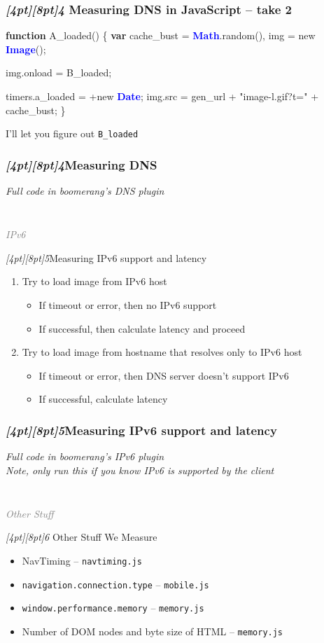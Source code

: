 \documentclass{beamer}
\newcommand{\sn}[1]{\textrm{\textit{\Huge{\raisebox{-3pt}[4pt][8pt]{\textcolor{f2elblue}{#1}}}}}\hspace{4pt}}
\newcommand{\innersplash}[1]{
  \begin{center}
    \large \textrm{\textit{ #1 } }
  \end{center}
}
\newcommand{\splashslide}[2][{}]{
  \begin{frame}
  \frametitle{#1}
  \innersplash{#2}
  \end{frame}
}
\newcommand{\leadinslide}[2]{
  \splashslide{
     {\fontsize{150}{20}\selectfont{\raisebox{0pt}[90pt][0pt]{\textcolor{light-gray}{#1}}}} \\ \huge \textcolor{gray}{#2}
  }
}
\def\green<#1>#2{\textcolor<#1>{dark-green}{\textbf<#1>{#2}}}
\def\blue<#1>#2{\textcolor<#1>{blue}{\textbf<#1>{#2}}}
\begin{document}
\begin{frame}[fragile]
\frametitle{\sn{4} Measuring DNS in JavaScript -- take 2}
\begin{semiverbatim}
\green<1>{function} A\_loaded() \{
  \green<1>{var} cache\_bust = \blue<1>{Math}.random(),
      img = new \blue<1>{Image}();

  img.onload = B\_loaded;

  timers.a\_loaded = +new \blue<1>{Date};
  img.src = gen\_url + "image-l.gif?t=" + cache\_bust;
\}
\end{semiverbatim}

\vspace{1.2em}
I'll let you figure out \texttt{B\_loaded}
\end{frame}

\splashslide[\sn{4}Measuring DNS]{ Full code in boomerang's DNS plugin }

\leadinslide{5}{IPv6}

\begin{frame}{\sn{5}Measuring IPv6 support and latency}
\begin{enumerate}
  \item Try to load image from IPv6 host
  \begin{itemize}
    \item If timeout or error, then no IPv6 support
    \item If successful, then calculate latency and proceed
  \end{itemize}
  \item Try to load image from hostname that resolves only to IPv6 host
  \begin{itemize}
    \item If timeout or error, then DNS server doesn't support IPv6
    \item If successful, calculate latency
  \end{itemize}
\end{enumerate}
\end{frame}

\splashslide[\sn{5}Measuring IPv6 support and latency]{ Full code in boomerang's IPv6 plugin \\ \tiny Note, only run this if you know IPv6 is supported by the client}

\leadinslide{6}{Other Stuff}

\begin{frame}{\sn{6} Other Stuff We Measure}
\begin{itemize}
  \item NavTiming -- \texttt{navtiming.js}
  \item \texttt{navigation.connection.type} -- \texttt{mobile.js}
  \item \texttt{window.performance.memory}  -- \texttt{memory.js}
  \item Number of DOM nodes and byte size of HTML -- \texttt{memory.js}
\end{itemize}
\end{frame}
\end{document}
